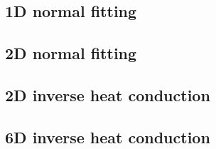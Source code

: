 \subsection{1D normal fitting}


\subsection{2D normal fitting}


\subsection{2D inverse heat conduction}


\subsection{6D inverse heat conduction}
